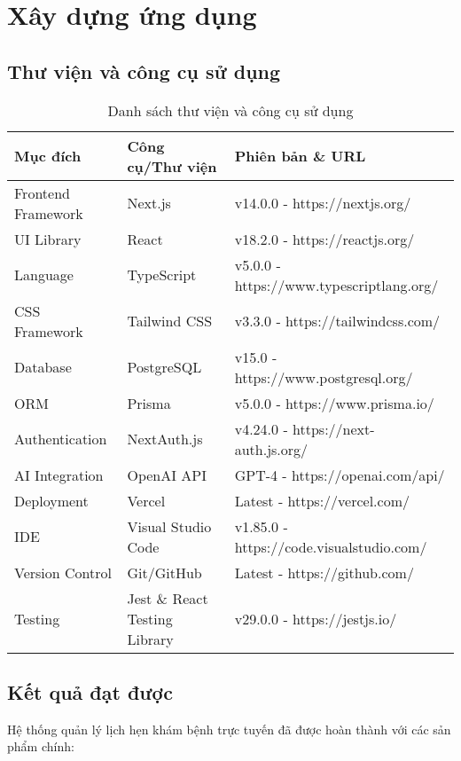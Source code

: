 \documentclass[../DoAn.tex]{subfiles}
\begin{document}
\section{Xây dựng ứng dụng}
\subsection{Thư viện và công cụ sử dụng}

\begin{table}[H]
\centering
\begin{tabular}{|p{3cm}|p{4cm}|p{6cm}|}
\hline
\textbf{Mục đích} & \textbf{Công cụ/Thư viện} & \textbf{Phiên bản \& URL} \\
\hline
Frontend Framework & Next.js & v14.0.0 - https://nextjs.org/ \\
\hline
UI Library & React & v18.2.0 - https://reactjs.org/ \\
\hline
Language & TypeScript & v5.0.0 - https://www.typescriptlang.org/ \\
\hline
CSS Framework & Tailwind CSS & v3.3.0 - https://tailwindcss.com/ \\
\hline
Database & PostgreSQL & v15.0 - https://www.postgresql.org/ \\
\hline
ORM & Prisma & v5.0.0 - https://www.prisma.io/ \\
\hline
Authentication & NextAuth.js & v4.24.0 - https://next-auth.js.org/ \\
\hline
AI Integration & OpenAI API & GPT-4 - https://openai.com/api/ \\
\hline
Deployment & Vercel & Latest - https://vercel.com/ \\
\hline
IDE & Visual Studio Code & v1.85.0 - https://code.visualstudio.com/ \\
\hline
Version Control & Git/GitHub & Latest - https://github.com/ \\
\hline
Testing & Jest \& React Testing Library & v29.0.0 - https://jestjs.io/ \\
\hline
\end{tabular}
\caption{Danh sách thư viện và công cụ sử dụng}
\label{table:tools}
\end{table}

\subsection{Kết quả đạt được}

Hệ thống quản lý lịch hẹn khám bệnh trực tuyến đã được hoàn thành với các sản phẩm chính:
\end{document}
